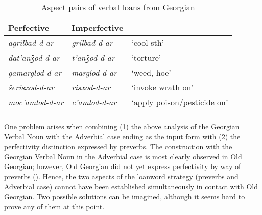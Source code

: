 \begin{table}
	\begin{tabular}{lll}
    \lsptoprule
		Perfective & Imperfective & \\
        \midrule
		\textit{agrilbad-d-ar} & \textit{grilbad-d-ar} & `cool sth' \\
		\textit{dat'anǯod-d-ar} &  \textit{t'anǯod-d-ar} & `torture' \\
		\textit{gamarglod-d-ar} & \textit{marglod-d-ar} & `weed, hoe' \\
		\textit{šerisxod-d-ar} & \textit{risxod-d-ar} & `invoke wrath on' \\
		\textit{moc'amlod-d-ar} &  \textit{c'amlod-d-ar} &  `apply poison/pesticide on' \\
        \lspbottomrule
	\end{tabular}
	\caption{Aspect pairs of verbal loans from Georgian}
	\label{table-georgianborrowaspect}
\end{table}


One problem arises when combining (1) the above analysis of the Georgian Verbal Noun with the Adverbial case ending as the input form with (2) the perfectivity distinction expressed by preverbs. The construction with the Georgian Verbal Noun in the Adverbial case is most clearly observed in Old Georgian; however, Old Georgian did not yet express perfectivity by way of preverbs (\cite{gippertOGeo}). Hence, the two aspects of the loanword strategy (preverbs and Adverbial case) cannot have been established simultaneously in contact with Old Georgian. Two possible solutions can be imagined, although it seems hard to prove any of them at this point. 

